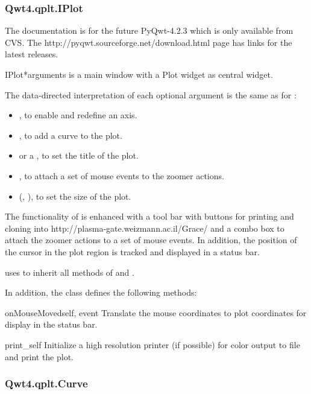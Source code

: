 \documentclass{manual}
\newcommand{\Grace}{\ulink{Grace}
  {http://plasma-gate.weizmann.ac.il/Grace/}}
\newcommand{\Download}{\ulink{download}
  {http://pyqwt.sourceforge.net/download.html}}
\newcommand{\Future}{
  \begin{notice}[warning]
    The documentation is for the future PyQwt-4.2.3 which is only available
    from CVS. The \Download{} page has links for the latest releases.
  \end{notice}
}
\begin{document}
\subsubsection{Qwt4.qplt.IPlot \label{intro-qplt-iplot}}

\Future{}

\begin{classdesc}{IPlot}{*arguments}
   is a main window with a Plot widget as central widget.

  The data-directed interpretation of each optional argument is the
  same as for :
  \begin{itemize}
  \item
    , to enable and redefine an axis.
  \item
    , to add a curve to the plot.
  \item
     or a , to set the title of the plot.
  \item
    , to attach a set of mouse events to the zoomer actions.
  \item
    (, ), to set the size of the plot.
  \end{itemize}

  The functionality of  is enhanced with a tool bar with
  buttons for printing and cloning into \Grace{} and a combo box to attach
  the zoomer actions to a set of mouse events.
  In addition, the position of the cursor in the plot region is tracked
  and displayed in a status bar. 

   uses  to inherit all methods of
   and .


In addition, the class  defines the following methods:

\begin{methoddesc}[Plot]{onMouseMoved}{self, event}
Translate the mouse coordinates to plot coordinates for display in the status
bar.
\end{methoddesc}

\begin{methoddesc}[IPlot]{print_}{self}
Initialize a high resolution printer (if possible) for color output to file and
print the plot.
\end{methoddesc}

\end{classdesc}

\subsubsection{Qwt4.qplt.Curve \label{intro-qplt-curve}}
\end{document}
